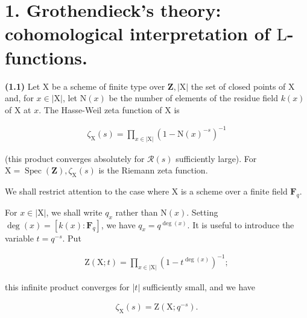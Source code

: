 \documentclass[10pt,leqno]{article}
\begin{document}
\section*{1. Grothendieck’s theory: cohomological interpretation of \(\mathrm{L}\)-functions.}

\noindent \textbf{(1.1)} Let \(\mathrm{X}\) be a scheme of finite type over \(\mathbf{Z}, |\mathrm{X}|\) the set of closed points of \(\mathrm{X}\) and, for \(x\in |\mathrm{X}|\), let \(\mathrm{N}(x)\) be the number of elements of the residue field \(k(x)\) of \(\mathrm{X}\) at \(x\). The Hasse-Weil zeta function of \(\mathrm{X}\) is\par

\begin{equation*}\begin{gathered}\zeta _{\mathrm{X}}(s) = \prod _{x\in |\mathrm{X}|} (1 -  \mathrm{N}(x)^{- s})^{- 1}\end{gathered}\tag{1.1.1}\end{equation*}

\noindent (this product converges absolutely for \(\mathcal{R} (s)\) sufficiently large). For \(\mathrm{X} = \operatorname{Spec}(\mathbf{Z}), \zeta _{\mathrm{X}}(s)\) is the Riemann zeta function.\par

\noindent We shall restrict attention to the case where \(\mathrm{X}\) is a scheme over a finite field \(\mathbf{F}_{q}\).\par

\clearpage

\label{physical-3}

\noindent For \(x\in |\mathrm{X}|\), we shall write \(q_{x}\) rather than \(\mathrm{N}(x)\). Setting \(\operatorname{deg}(x)=[k(x):\mathbf{F}_{q}]\), we have \(q_{x}=q^{\operatorname{deg}(x)}\). It is useful to introduce the variable \(t=q^{- s}\). Put\par

\begin{equation*}\begin{gathered}\mathrm{Z}(\mathrm{X}; t) = \prod _{x\in |\mathrm{X}|} (1 -  t^{\operatorname{deg}(x)})^{- 1} ;\end{gathered}\tag{1.1.2}\end{equation*}

\noindent this infinite product converges for |\(t|\) sufficiently small, and we have\par

\begin{equation*}\begin{gathered}\zeta _{\mathrm{X}}(s) = \mathrm{Z}(\mathrm{X}; q^{- s}).\end{gathered}\tag{1.1.3}\end{equation*}
\end{document}
